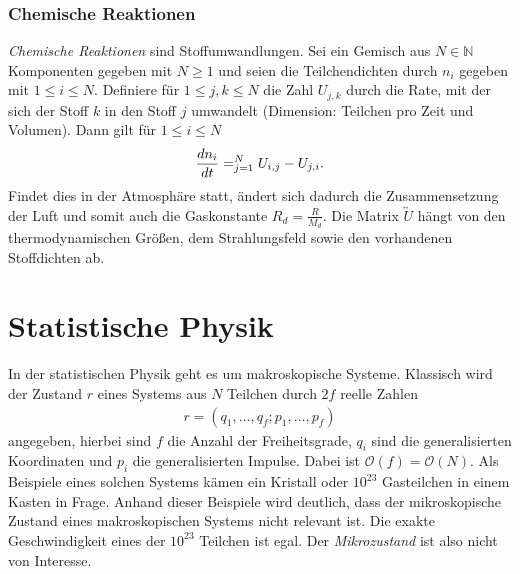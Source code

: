 \documentclass{book}
\let\sum\relax
\DeclareMathOperator*{\sum}{\raisebox{-3.5pt}{\scalebox{2}{\rotatebox{1}{{\bask Σ}}}}}
\begin{document}
\subsubsection{Chemische Reaktionen}
\label{sec:chemische_reaktionen}

\textit{Chemische Reaktionen} sind Stoffumwandlungen. Sei ein Gemisch aus $N\in\mathbb{N}$ Komponenten gegeben mit $N\geq1$ und seien die Teilchendichten durch $n_i$ gegeben mit $1\leq i\leq N$. Definiere für $1\leq j, k\leq N$ die Zahl $U_{j, k}$ durch die Rate, mit der sich der Stoff $k$ in den Stoff $j$ umwandelt (Dimension: Teilchen pro Zeit und Volumen). Dann gilt für $1\leq i\leq N$ 
%
\begin{eqnarray}
\frac{dn_i}{dt} = \sum_{j = 1}^{N}U_{i, j} - U_{j, i}.
\end{eqnarray}
%
Findet dies in der Atmosphäre statt, ändert sich dadurch die Zusammensetzung der Luft und somit auch die Gaskonstante $R_d=\frac{R}{M_d}$. Die Matrix $\overleftrightarrow{U}$ hängt von den thermodynamischen Größen, dem Strahlungsfeld sowie den vorhandenen Stoffdichten ab.

\section{Statistische Physik}
\label{sec:statistische_physik}

In der statistischen Physik geht es um makroskopische Systeme. Klassisch wird der Zustand $r$ eines Systems aus $N$ Teilchen durch $2f$ reelle Zahlen
%
\begin{eqnarray}
r = \left(q_1, \dotsc, q_f;p_1, \dotsc, p_f\right)
\end{eqnarray}
%
angegeben, hierbei sind $f$ die Anzahl der Freiheitsgrade, $q_i$ sind die generalisierten Koordinaten und $p_i$ die generalisierten Impulse. Dabei ist $\mathcal{O}\left(f\right) = \mathcal{O}\left(N\right)$. Als Beispiele eines solchen Systems kämen ein Kristall oder $10^{23}$ Gasteilchen in einem Kasten in Frage. Anhand dieser Beispiele wird deutlich, dass der mikroskopische Zustand eines makroskopischen Systems nicht relevant ist. Die exakte Geschwindigkeit eines der $10^{23}$ Teilchen ist egal. Der \textit{Mikrozustand} ist also nicht von Interesse.
\end{document}
